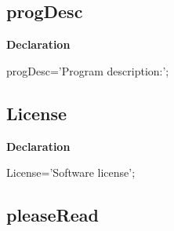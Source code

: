 \documentclass{report}
\newif\ifpdf
\begin{document}
\subsection*{progDesc}
\fi
\label{trstrings-progDesc}
\begin{list}{}{
\setlength{\itemindent}{0cm}
\setlength{\listparindent}{0cm}
\setlength{\leftmargin}{\evensidemargin}
\addtolength{\leftmargin}{\tmplength}
\settowidth{\labelsep}{X}
\addtolength{\leftmargin}{\labelsep}
\setlength{\labelwidth}{\tmplength}
}
\item[\textbf{Declaration}\hfill]
\ifpdf
\begin{flushleft}
\fi
\begin{ttfamily}
progDesc='Program description:';\end{ttfamily}

\ifpdf
\end{flushleft}
\fi

\end{list}
\ifpdf
\subsection*{\large{\textbf{License}}\normalsize\hspace{1ex}\hrulefill}
\else
\subsection*{License}
\fi
\label{trstrings-License}
\begin{list}{}{
\setlength{\itemindent}{0cm}
\setlength{\listparindent}{0cm}
\setlength{\leftmargin}{\evensidemargin}
\addtolength{\leftmargin}{\tmplength}
\settowidth{\labelsep}{X}
\addtolength{\leftmargin}{\labelsep}
\setlength{\labelwidth}{\tmplength}
}
\item[\textbf{Declaration}\hfill]
\ifpdf
\begin{flushleft}
\fi
\begin{ttfamily}
License='Software license';\end{ttfamily}

\ifpdf
\end{flushleft}
\fi

\end{list}
\ifpdf
\subsection*{\large{\textbf{pleaseRead}}\normalsize\hspace{1ex}\hrulefill}
\else
\end{document}

